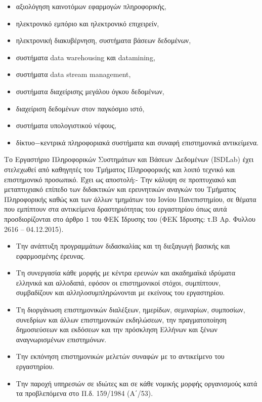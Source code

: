 \begin{itemize}
\item
  αξιολόγηση καινοτόμων εφαρμογών πληροφορικής,
\item
  ηλεκτρονικό εμπόριο και ηλεκτρονικό επιχειρείν,
\item
  ηλεκτρονική διακυβέρνηση, συστήματα βάσεων δεδομένων,
\item
  συστήματα data warehousing και datamining,
\item
  συστήματα data stream management,
\item
  συστήματα διαχείρισης μεγάλου όγκου δεδομένων,
\item
  διαχείριση δεδομένων στον παγκόσμιο ιστό,
\item
  συστήματα υπολογιστικού νέφους,
\item
  δίκτυο−κεντρικά πληροφοριακά συστήματα και συναφή επιστημονικά
  αντικείμενα.
\end{itemize}

Το Εργαστήριο Πληροφορικών Συστημάτων και Βάσεων Δεδομένων (ISDLab) έχει
στελεχωθεί από καθηγητές του Τμήματος Πληροφορικής και λοιπό τεχνικό και
επιστημονικό προσωπικό. Έχει ως αποστολή:- Την κάλυψη σε προπτυχιακό και
μεταπτυχιακό επίπεδο των διδακτικών και ερευνητικών αναγκών του Τμήματος
Πληροφορικής καθώς και των άλλων τμημάτων του Ιονίου Πανεπιστημίου, σε
θέματα που εμπίπτουν στα αντικείμενα δραστηριότητας του εργαστηρίου όπως
αυτά προσδιορίζονται στο άρθρο 1 του ΦΕΚ Ίδρυσης του (ΦΕΚ Ίδρυσης: τ.Β
Αρ. Φυλλου 2616 -- 04.12.2015).

\begin{itemize}
\item
  Την ανάπτυξη προγραμμάτων διδασκαλίας και τη διεξαγωγή βασικής και
  εφαρμοσμένης έρευνας.
\item
  Τη συνεργασία κάθε μορφής με κέντρα ερευνών και ακαδημαϊκά ιδρύματα
  ελληνικά και αλλοδαπά, εφόσον οι επιστημονικοί στόχοι, συμπίπτουν,
  συμβαδίζουν και αλληλοσυμπληρώνονται με εκείνους του εργαστηρίου.
\item
  Τη διοργάνωση επιστημονικών διαλέξεων, ημερίδων, σεμιναρίων,
  συμποσίων, συνεδρίων και άλλων επιστημονικών εκδηλώσεων, την
  πραγματοποίηση δημοσιεύσεων και εκδόσεων και την πρόσκληση Ελλήνων και
  ξένων αναγνωρισμένων επιστημόνων.
\item
  Την εκπόνηση επιστημονικών μελετών συναφών με το αντικείμενο του
  εργαστηρίου.
\item
  Την παροχή υπηρεσιών σε ιδιώτες και σε κάθε νομικής μορφής οργανισμούς
  κατά τα προβλεπόμενα στο Π.δ. 159/1984 (Α΄/53).
\end{itemize}

